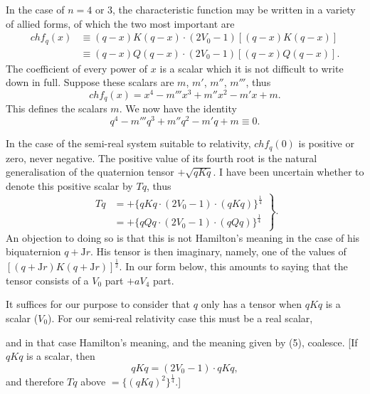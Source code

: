 \documentclass[11pt]{article}
\begin{document}
\indent In the case of $n=4$ or $3$, the characteristic function may be written in a variety of allied forms, of which the two most important are
\begin{align}chf_q(x)&\equiv(q-x)K(q-x)\cdot(2V_0-1)[(q-x)K(q-x)]\tag{1}\\&\equiv(q-x)Q(q-x)\cdot(2V_0-1)[(q-x)Q(q-x)].\tag{2}\end{align}
The coefficient of every power of $x$ is a scalar which it is not difficult to write down in full. Suppose these scalars are $m$, $m'$, $m''$, $m'''$, thus
\begin{equation}chf_q(x)=x^4-m'''x^3+m''x^2-m'x+m.\tag{3}\end{equation}
This defines the scalars $m$. We now have the identity
\begin{equation}q^4-m'''q^3+m''q^2-m'q+m\equiv0.\tag{4}\end{equation}


\indent In the case of the semi-real system suitable to relativity, $chf_q(0)$ is positive or zero, never negative. The positive value of its fourth root is the natural generalisation of the quaternion tensor $+\sqrt{qKq}$. I have been uncertain whether to denote this positive scalar by $Tq$, thus
\begin{equation}\left.\begin{aligned}Tq&=+\{qKq\cdot(2V_0-1)\cdot(qKq)\}^{\frac14}\\&=+\{qQq\cdot(2V_0-1)\cdot(qQq)\}^{\frac14}\end{aligned}\right\}.\tag{5}\end{equation}
An objection to doing so is that this is not Hamilton's meaning in the case of his biquaternion $q+\mathrm{J}r$. His tensor is then imaginary, namely, one of the values of $[(q+\mathrm{J}r)K(q+\mathrm{J}r)]^{\frac12}$. In our form below, this amounts to saying that the tensor consists of a $V_0$ part $+aV_4$ part.

\indent It suffices for our purpose to consider that $q$ only has a tensor when $qKq$ is a scalar ($V_0$). For our semi-real relativity case this must be a real scalar,

and in that case Hamilton's meaning, and the meaning given by (5), coalesce. [If $qKq$ is a scalar, then
\begin{equation}qKq=(2V_0-1)\cdot qKq,\end{equation}
and therefore $Tq$ above $=\{(qKq)^2\}^{\frac14}$.]
\end{document}
